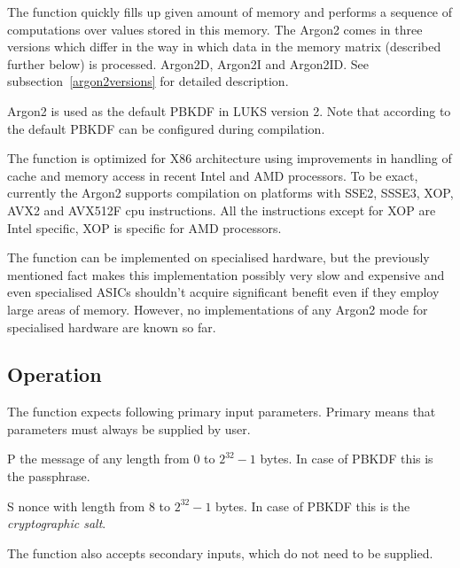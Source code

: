 \documentclass[nolof]{fithesis3}
\begin{document}
The function quickly fills up given amount of memory and performs a sequence of computations over values stored in this memory. The Argon2 comes in three versions which differ in the way in which data in the memory matrix (described further below) is processed. Argon2D, Argon2I and Argon2ID. See subsection~\ref{argon2versions} for detailed description.

Argon2 is used as the default PBKDF in LUKS version 2. Note that according to \parencite{cryptsetupmanual} the default PBKDF can be configured during compilation.

The function is optimized for X86 architecture using improvements in handling of cache and memory access in recent Intel and AMD processors. To be exact, currently the Argon2 supports compilation on platforms with SSE2, SSSE3, XOP, AVX2 and AVX512F cpu instructions. All the instructions except for XOP are Intel specific, XOP is specific for AMD processors.

The function can be implemented on specialised hardware, but the previously mentioned fact makes this implementation possibly very slow and expensive and even specialised ASICs shouldn't acquire significant benefit even if they employ large areas of memory. However, no implementations of any Argon2 mode for specialised hardware are known so far.

\subsection{Operation}
The function expects following primary input parameters. Primary means that parameters must always be supplied by user.

\begin{description}
\item{P} the message of any length from 0 to \(2^{32} - 1\) bytes. In case of PBKDF this is the passphrase.

\item{S} nonce with length from 8 to \(2^{32} - 1\) bytes. In case of PBKDF this is the \emph{cryptographic salt}.
\end{description}

The function also accepts secondary inputs, which do not need to be supplied.
\end{document}

